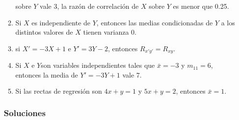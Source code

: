 \documentclass[fleqn]{article}
\begin{document}
\begin{enumerate}
\begin{enumerate}
                                        sobre $Y$ vale 3, la razón de correlación de $X$ sobre $Y$ es menor que 0.25.
                                \item Si $X$ es independiente de $Y$, entonces las medias condicionadas de $Y$ a los distintos valores 
                                        de $X$ tienen varianza 0.
                                \item si $X' = -3X + 1$ e $ Y' = 3Y - 2$, entonces $R_{x'y'} = R_{xy}$.
                                \item Si $X$ e $Y$son variables independientes tales que $\bar{x} = -3$ y $m_{11} = 6$, entonces la media 
                                        de $Y' = -3Y + 1$ vale 7.
                                \item Si las rectas de regresión son $4x + y = 1$ y $5x + y = 2$, entonces $\bar{x} = 1$.
                        \end{enumerate}


                \newpage

                \subsubsection{Soluciones}


\end{enumerate}
\end{document}
